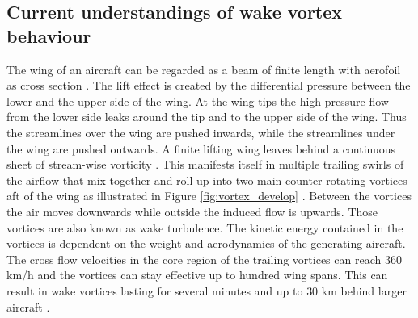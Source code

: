 %



\subsection{Current understandings of wake vortex behaviour}
The wing of an aircraft can be regarded as a beam of finite length with aerofoil as cross section \cite{hansen2015aerodynamics}.
The lift effect is created by the differential pressure between the lower and the upper side of the wing. At the wing tips the high pressure flow from the lower side leaks around the tip and to the upper side of the wing. Thus the streamlines over the wing are pushed inwards, while the streamlines under the wing are pushed outwards. A finite lifting wing leaves behind a continuous sheet of stream-wise vorticity  \cite{hansen2015aerodynamics}.  This manifests itself in multiple trailing swirls of the airflow that mix together and roll up into two main counter-rotating vortices aft of the wing as illustrated in Figure \ref{fig:vortex_develop} \cite{magazine_aibus_safety, Breitsamter2011Feb, gerz_commercial_2002}. Between the vortices the air moves downwards while outside the induced flow is upwards. Those vortices are also known as wake turbulence. 
The kinetic energy contained in the vortices is dependent on the weight and aerodynamics of the generating aircraft. The cross flow velocities in the core region of the trailing vortices can reach $360$ km/h and the vortices can stay effective up to hundred wing spans. This can result in wake vortices lasting for several minutes and up to $30$ km behind larger aircraft \cite{Breitsamter2011Feb, gerz_commercial_2002}. 

